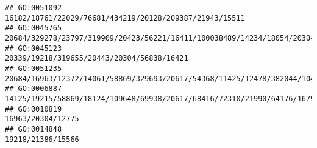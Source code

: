 \documentclass[
]{article}
\begin{document}
\begin{verbatim}
## GO:0051092                                                                                                                                                                                                                                                                                                                                                      16182/18761/22029/76681/434219/20128/209387/21943/15511
## GO:0045765                                                                                                                                                                                                                                                                                                20684/329278/23797/319909/20423/56221/16411/100038489/14234/18054/20304/18053/217369/17228/106014/13078/12766
## GO:0045123                                                                                                                                                                                                                                                                                                                                                                   20339/19218/319655/20443/20304/56838/16421
## GO:0051235                                                                                                                                                                                                                                                                                         20684/16963/12372/14061/58869/329693/20617/54368/11425/12478/382044/104158/13897/17751/23832/20259/12684/14126/12766
## GO:0006887                                                                                                                                                                                                                                                                                    14125/19215/58869/18124/109648/69938/20617/68416/72310/21990/64176/16797/20307/20304/27062/116838/58226/14126/11551/12229
## GO:0010819                                                                                                                                                                                                                                                                                                                                                                                            16963/20304/12775
## GO:0014848                                                                                                                                                                                                                                                                                                                                                                                            19218/21386/15566

\end{verbatim}
\end{document}
